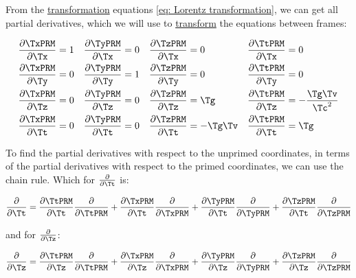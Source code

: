 \begin{derivation}

	From the \hyperlink{def-transform}{transformation} equations \eqref{eq: Lorentz transformation}, we can get all partial derivatives, which we will use to \hyperlink{def-transform}{transform} the equations between frames:

	\begin{equation}
		\begin{aligned}
			\frac{\partial \TxPRM }{\partial \Tx } & = 1 & \frac{\partial \TyPRM }{\partial \Tx } & = 0 & \frac{\partial \TzPRM }{\partial \Tx } & = 0         & \frac{\partial \TtPRM }{\partial \Tx } & = 0                     \\
			\frac{\partial \TxPRM }{\partial \Ty } & = 0 & \frac{\partial \TyPRM }{\partial \Ty } & = 1 & \frac{\partial \TzPRM }{\partial \Ty } & = 0         & \frac{\partial \TtPRM }{\partial \Ty } & = 0                     \\
			\frac{\partial \TxPRM }{\partial \Tz } & = 0 & \frac{\partial \TyPRM }{\partial \Tz } & = 0 & \frac{\partial \TzPRM }{\partial \Tz } & = \Tg     & \frac{\partial \TtPRM }{\partial \Tz } & = -\frac{\Tg  \Tv }{\Tc ^2} \\
			\frac{\partial \TxPRM }{\partial \Tt } & = 0 & \frac{\partial \TyPRM }{\partial \Tt } & = 0 & \frac{\partial \TzPRM }{\partial \Tt } & = -\Tg  \Tv  & \frac{\partial \TtPRM }{\partial \Tt } & = \Tg
		\end{aligned}
	\end{equation}

	To find the partial derivatives with respect to the unprimed coordinates, in terms of the partial derivatives with respect to the primed coordinates, we can use the chain rule.
	Which for $\frac{\partial}{\partial \Tt }$ is:

	\begin{equation}
		\frac{\partial}{\partial \Tt } = \frac{\partial \TtPRM }{\partial \Tt }\frac{\partial}{\partial \TtPRM } + \frac{\partial \TxPRM }{\partial \Tt }\frac{\partial}{\partial \TxPRM } + \frac{\partial \TyPRM }{\partial \Tt }\frac{\partial}{\partial \TyPRM } + \frac{\partial \TzPRM }{\partial \Tt }\frac{\partial}{\partial \TzPRM }
	\end{equation}

	and for $\frac{\partial}{\partial \Tz }$:

	\begin{equation}
		\frac{\partial}{\partial \Tz } = \frac{\partial \TtPRM }{\partial \Tz } \frac{\partial}{\partial \TtPRM } + \frac{\partial \TxPRM }{\partial \Tz } \frac{\partial}{\partial \TxPRM } + \frac{\partial \TyPRM }{\partial \Tz } \frac{\partial}{\partial \TyPRM } + \frac{\partial \TzPRM }{\partial \Tz } \frac{\partial}{\partial \TzPRM }
	\end{equation}


\end{derivation}
